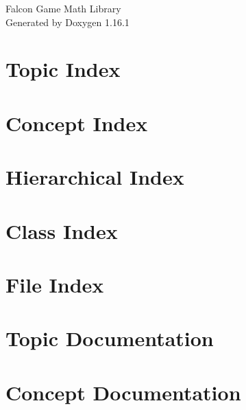 \documentclass[twoside]{book}
\newcommand{\+}{\discretionary{\mbox{\scriptsize$\hookleftarrow$}}{}{}}
\newcommand{\clearemptydoublepage}{%
    \newpage{\pagestyle{empty}\cleardoublepage}%
  }
\begin{document}
  \raggedbottom
    \hypersetup{pageanchor=false,
                bookmarksnumbered=true,
                pdfencoding=unicode
               }
  \begin{titlepage}
  \vspace*{7cm}
  \begin{center}%
  {\Large Falcon Game Math Library}\\
  \vspace*{1cm}
  {\large Generated by Doxygen 1.16.1}\\
  \end{center}
  \end{titlepage}
  \clearemptydoublepage
  \tableofcontents
  \clearemptydoublepage
  \hypersetup{pageanchor=true}



\chapter{Topic Index}

\chapter{Concept Index}

\chapter{Hierarchical Index}

\chapter{Class Index}

\chapter{File Index}

\chapter{Topic Documentation}


\chapter{Concept Documentation}





\end{document}
